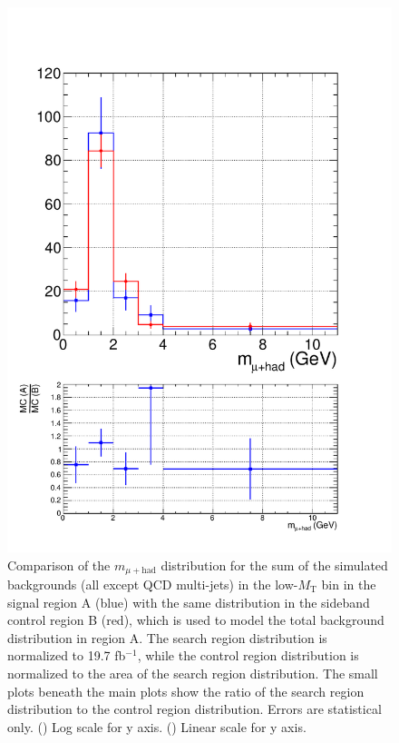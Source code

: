 \begin{figure}[hbtp]
\begin{center}
    \includegraphics[width=\cmsFigWidth]{figures/MCClosure_linear_highMT_v87}
    \caption{Comparison of the $m_{\mu+\text{had}}$ distribution for the sum of the simulated backgrounds (all except QCD multi-jets) in the low-$M_{\text{T}}$ bin in the signal region A (blue) with the same distribution in the sideband control region B (red), which is used to model the total background distribution in region A.  The search region distribution is normalized to 19.7 fb$^{-1}$, while the control region distribution is normalized to the area of the search region distribution.  The small plots beneath the main plots show the ratio of the search region distribution to the control region distribution.  Errors are statistical only.  (\cmsLeft) Log scale for y axis.  (\cmsRight) Linear scale for y axis.}
    \label{fig:MC-regA-vs-regB-highMT}
  \end{center}
\end{figure}

